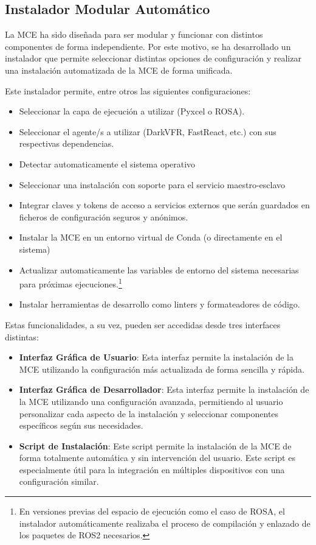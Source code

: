 \subsection{Instalador Modular Automático}
La MCE ha sido diseñada para ser modular y funcionar con distintos 
componentes de forma independiente. Por este motivo, se ha desarrollado
un instalador que permite seleccionar distintas opciones de configuración
y realizar una instalación automatizada de la MCE de forma unificada.

Este instalador permite, entre otros las siguientes configuraciones:

\begin{itemize}
    \item Seleccionar la capa de ejecución a utilizar (Pyxcel o ROSA).
    \item Seleccionar el agente/s a utilizar (DarkVFR, FastReact, etc.) 
    con sus respectivas dependencias. 
    \item Detectar automaticamente el sistema operativo
    \item Seleccionar una instalación con soporte para el servicio maestro-esclavo
    \item Integrar claves y tokens de acceso a servicios externos que serán guardados
    en ficheros de configuración seguros y anónimos.
    \item Instalar la MCE en un entorno virtual de Conda (o directamente en el sistema)
    \item Actualizar automaticamente las variables de entorno del sistema necesarias
    para próximas ejecuciones.\footnote{En versiones previas del espacio de ejecución
    como el caso de ROSA, el instalador automáticamente realizaba el proceso
    de compilación y enlazado de los paquetes de ROS2 necesarios.}
    \item Instalar herramientas de desarrollo como linters y formateadores de código.
\end{itemize}

Estas funcionalidades, a su vez, pueden ser accedidas desde tres interfaces distintas:

\begin{itemize}
    \item \textbf{Interfaz Gráfica de Usuario}: Esta interfaz permite la instalación de
    la MCE utilizando la configuración más actualizada de forma sencilla y rápida.

    \item \textbf{Interfaz Gráfica de Desarrollador}: Esta interfaz permite
    la instalación de la MCE utilizando una configuración avanzada, permitiendo 
    al usuario personalizar cada aspecto de la instalación y seleccionar
    componentes específicos según sus necesidades.

    \item \textbf{Script de Instalación}: Este script permite la instalación
    de la MCE de forma totalmente automática y sin intervención del usuario.
    Este script es especialmente útil para la integración en múltiples dispositivos
    con una configuración similar.
\end{itemize}

